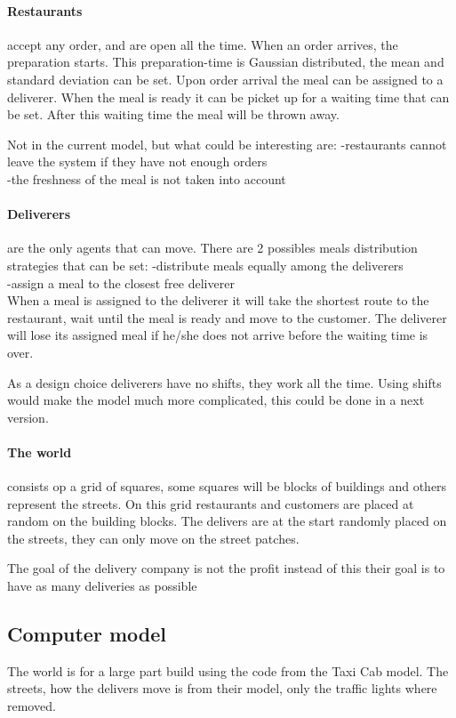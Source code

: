 \paragraph{Restaurants} accept any order, and are open all the time.
When an order arrives, the preparation starts.
This preparation-time is Gaussian distributed, the mean and standard deviation can be set.
Upon order arrival the meal can be assigned to a deliverer.
When the meal is ready it can be picket up for a waiting time that can be set.
After this waiting time the meal will be thrown away.

Not in the current model, but what could be interesting are:
-restaurants cannot leave the system if they have not enough orders\\
-the freshness of the meal is not taken into account\\

\paragraph{Deliverers} are the only agents that can move.
There are 2 possibles meals distribution strategies that can be set:
-distribute meals equally among the deliverers\\
-assign a meal to the closest free deliverer\\

When a meal is assigned to the deliverer it will take the shortest route
to the restaurant, wait until the meal is ready and move to the customer.
The deliverer will lose its assigned meal if he/she does not arrive before the waiting time is over.

As a design choice deliverers have no shifts, they work all the time.
Using shifts would make the model much more complicated, this could be done in a next version.

\paragraph{The world} consists op a grid of squares, some squares will be blocks of buildings and others represent the streets.
On this grid restaurants and customers are placed at random on the building blocks.
The delivers are at the start randomly placed on the streets, they can only move on the street patches.

The goal of the delivery company is not the profit instead of this their goal is to have as many deliveries as possible

\subsection{Computer model}\label{subsec:computer-model}
The world is for a large part build using the code from the Taxi Cab model.
The streets, how the delivers move is from their model, only the traffic lights where removed.

